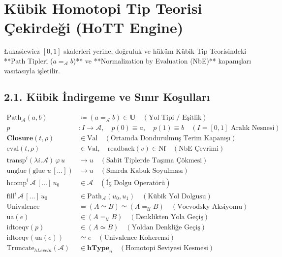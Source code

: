 \documentclass[11pt, a4paper]{article}
\begin{document}
\section{Kübik Homotopi Tip Teorisi Çekirdeği (HoTT Engine)}

Łukasiewicz $[0, 1]$ skalerleri yerine, doğruluk ve hüküm Kübik Tip Teorisindeki **Path Tipleri ($a =_{\mathcal{A}} b$)** ve **Normalization by Evaluation (NbE)** kapanışları vasıtasıyla işletilir.

\subsection{2.1. Kübik İndirgeme ve Sınır Koşulları}
\begin{align}
\text{Path}_{\mathcal{A}}(a, b) &\coloneqq (a =_{\mathcal{A}} b) \in \mathbf{U} \quad (\text{Yol Tipi / Eşitlik}) \\
p &: I \longrightarrow \mathcal{A}, \quad p(0) \equiv a, \quad p(1) \equiv b \quad (I = [0, 1] \text{ Aralık Nesnesi}) \\
\mathbf{Closure}(t, \rho) &\in \text{Val} \quad (\text{Ortamda Dondurulmuş Terim Kapanışı}) \\
\text{eval}(t, \rho) &\in \text{Val}, \quad \text{readback}(v) \in \text{Nf} \quad (\text{NbE Çevrimi}) \\
\text{transp}^i (\lambda i. \mathcal{A}) \, \varphi \, u &\longrightarrow u \quad (\text{Sabit Tiplerde Taşıma Çökmesi}) \\
\text{unglue}(\text{glue } u \, [\dots]) &\longrightarrow u \quad (\text{Sınırda Kabuk Soyulması}) \\
\text{hcomp}^i \, \mathcal{A} \, [\dots] \, u_0 &\in \mathcal{A} \quad (\text{İç Dolgu Operatörü}) \\
\text{fill}^i \, \mathcal{A} \, [\dots] \, u_0 &\in \text{Path}_{\mathcal{A}}(u_0, u_1) \quad (\text{Kübik Yol Dolgusu}) \\
\text{Univalence} &= (A \simeq B) \simeq (A =_{\mathcal{U}} B) \quad (\text{Voevodsky Aksiyomu}) \\
\text{ua}(e) &\in (A =_{\mathcal{U}} B) \quad (\text{Denklikten Yola Geçiş}) \\
\text{idtoeqv}(p) &\in (A \simeq B) \quad (\text{Yoldan Denkliğe Geçiş}) \\
\text{idtoeqv}(\text{ua}(e)) &\simeq e \quad (\text{Univalence Koherensi}) \\
\text{Truncate}_{hLevel n}(\mathcal{A}) &\in \mathbf{hType}_n \quad (\text{Homotopi Seviyesi Kesmesi}) \\

\end{align}
\end{document}
